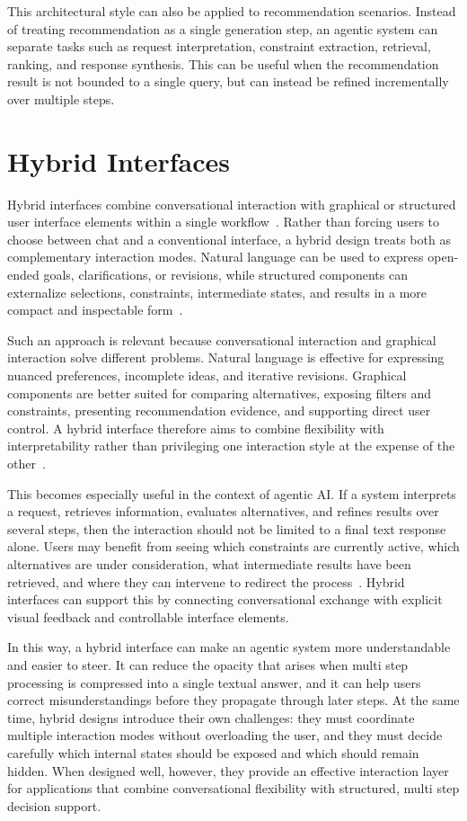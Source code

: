 This architectural style can also be applied to recommendation scenarios. Instead of treating recommendation as a single generation step, an agentic system can separate tasks such as request interpretation, constraint extraction, retrieval, ranking, and response synthesis. This can be useful when the recommendation result is not bounded to a single query, but can instead be refined incrementally over multiple steps.

\section{Hybrid Interfaces}\label{section:background:hybrid-interfaces}
Hybrid interfaces combine conversational interaction with graphical or structured user interface elements within a single workflow~\parencite{jarvinenPromptingFuture}. Rather than forcing users to choose between chat and a conventional interface, a hybrid design treats both as complementary interaction modes. Natural language can be used to express open-ended goals, clarifications, or revisions, while structured components can externalize selections, constraints, intermediate states, and results in a more compact and inspectable form~\parencite{jannachEvaluatingCRS}.

Such an approach is relevant because conversational interaction and graphical interaction solve different problems. Natural language is effective for expressing nuanced preferences, incomplete ideas, and iterative revisions. Graphical components are better suited for comparing alternatives, exposing filters and constraints, presenting recommendation evidence, and supporting direct user control. A hybrid interface therefore aims to combine flexibility with interpretability rather than privileging one interaction style at the expense of the other~\parencite{chenPuCritiquing}.

This becomes especially useful in the context of agentic AI. If a system interprets a request, retrieves information, evaluates alternatives, and refines results over several steps, then the interaction should not be limited to a final text response alone. Users may benefit from seeing which constraints are currently active, which alternatives are under consideration, what intermediate results have been retrieved, and where they can intervene to redirect the process~\parencite{chaseWhatIsAgent}. Hybrid interfaces can support this by connecting conversational exchange with explicit visual feedback and controllable interface elements.

In this way, a hybrid interface can make an agentic system more understandable and easier to steer. It can reduce the opacity that arises when multi step processing is compressed into a single textual answer, and it can help users correct misunderstandings before they propagate through later steps. At the same time, hybrid designs introduce their own challenges: they must coordinate multiple interaction modes without overloading the user, and they must decide carefully which internal states should be exposed and which should remain hidden. When designed well, however, they provide an effective interaction layer for applications that combine conversational flexibility with structured, multi step decision support.
